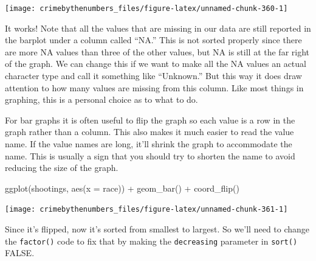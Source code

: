 \documentclass[
  a4paper,
]{krantz}
\makeatletter
\newenvironment{Shaded}{\begin{snugshade}}{\end{snugshade}}
\newcommand{\AttributeTok}[1]{\textcolor[rgb]{0.77,0.63,0.00}{#1}}
\newcommand{\ConstantTok}[1]{\textcolor[rgb]{0.00,0.00,0.00}{#1}}
\newcommand{\FunctionTok}[1]{\textcolor[rgb]{0.00,0.00,0.00}{#1}}
\newcommand{\NormalTok}[1]{#1}
\newcommand{\OtherTok}[1]{\textcolor[rgb]{0.56,0.35,0.01}{#1}}
\newcommand{\SpecialCharTok}[1]{\textcolor[rgb]{0.00,0.00,0.00}{#1}}
\newenvironment{kframe}{%
\medskip{}
\setlength{\fboxsep}{.8em}
 \def\at@end@of@kframe{}%
 \ifinner\ifhmode%
  \def\at@end@of@kframe{\end{minipage}}%
  \begin{minipage}{\columnwidth}%
 \fi\fi%
 \def\FrameCommand##1{\hskip\@totalleftmargin \hskip-\fboxsep
 \colorbox{shadecolor}{##1}\hskip-\fboxsep
     \hskip-\linewidth \hskip-\@totalleftmargin \hskip\columnwidth}%
 \MakeFramed {\advance\hsize-\width
   \@totalleftmargin\z@ \linewidth\hsize
   \@setminipage}}%
 {\par\unskip\endMakeFramed%
 \at@end@of@kframe}
\renewenvironment{Shaded}{\begin{kframe}}{\end{kframe}}
\makeatother
\begin{document}
\begin{center}\texttt{[image: crimebythenumbers\_files/figure-latex/unnamed-chunk-360-1]} \end{center}

It works! Note that all the values that are missing in our
data are still reported in the barplot under a column called
``NA.'' This is not sorted properly since there are more NA
values than three of the other values, but NA is still at
the far right of the graph. We can change this if we want to
make all the NA values an actual character type and call it
something like ``Unknown.'' But this way it does draw
attention to how many values are missing from this column.
Like most things in graphing, this is a personal choice as
to what to do.

For bar graphs it is often useful to flip the graph so each
value is a row in the graph rather than a column. This also
makes it much easier to read the value name. If the value
names are long, it'll shrink the graph to accommodate the
name. This is usually a sign that you should try to shorten
the name to avoid reducing the size of the graph.

\begin{Shaded}
\begin{Highlighting}[]
\FunctionTok{ggplot}\NormalTok{(shootings, }\FunctionTok{aes}\NormalTok{(}\AttributeTok{x =}\NormalTok{ race)) }\SpecialCharTok{+}
  \FunctionTok{geom\_bar}\NormalTok{() }\SpecialCharTok{+}
  \FunctionTok{coord\_flip}\NormalTok{()}
\end{Highlighting}
\end{Shaded}

\begin{center}\texttt{[image: crimebythenumbers\_files/figure-latex/unnamed-chunk-361-1]} \end{center}

Since it's flipped, now it's sorted from smallest to
largest. So we'll need to change the \texttt{factor()} code
to fix that by making the \texttt{decreasing} parameter in
\texttt{sort()} FALSE.

\begin{Shaded}
\end{Shaded}
\end{document}
